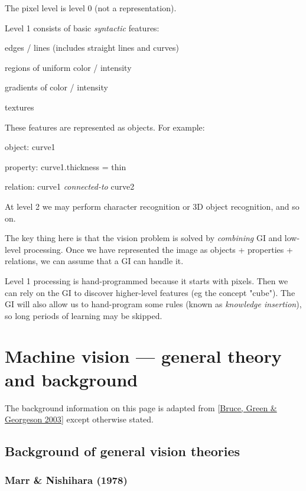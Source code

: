 The pixel level is level 0 (not a representation).

 Level 1 consists of basic \emph{syntactic} features:
\begin{compactenum}
	\item edges / lines (includes straight lines and curves)
	\item regions of uniform color / intensity
	\item gradients of color / intensity
	\item textures
\end{compactenum}

These features are represented as objects. For example:
\begin{compactenum}
	\item object: curve1
	\item property: curve1.thickness = thin
	\item relation: curve1 \emph{connected-to} curve2
\end{compactenum}

At level 2 we may perform character recognition or 3D object recognition, and so on. 

The key thing here is that the vision problem is solved by  \emph{combining} GI and low-level processing. Once we have represented the image as objects + properties + relations, we can assume that a GI can handle it.

Level 1 processing is hand-programmed because it starts with pixels. Then we can rely on the GI to discover higher-level features (eg the concept "cube"). The GI will also allow us to hand-program some rules (known as \emph{knowledge insertion}), so  long periods of learning may be skipped.

\section{Machine vision --- general theory and background}

The background information on this page is adapted from [\hyperlink{ref}{Bruce, Green \& Georgeson 2003}] except otherwise stated.

\subsection{Background of general vision theories}

\subsubsection{Marr \& Nishihara (1978)}


